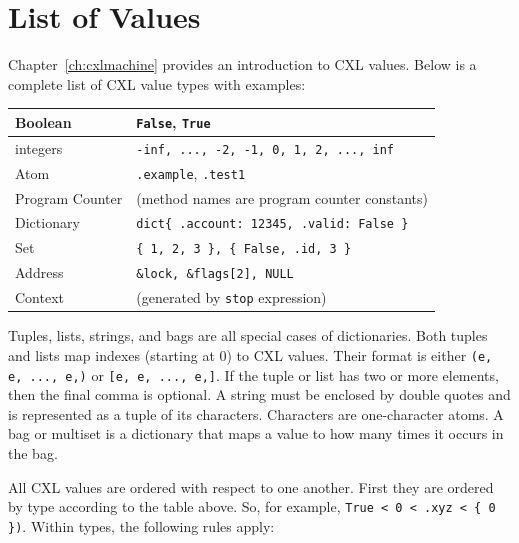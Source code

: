 \documentclass{report}
\begin{document}



\appendix

\chapter{List of Values}

Chapter~\ref{ch:cxlmachine} provides an introduction to CXL values.
Below is a complete list of CXL value types with examples:

\vspace{1em}
\begin{tabular}{|l|l|}
\hline
Boolean & \texttt{False}, \texttt{True} \\
\hline
integers & \texttt{-inf, ..., -2, -1, 0, 1, 2, ..., inf} \\
\hline
Atom & \texttt{.example}, \texttt{.test1} \\
\hline
Program Counter & (method names are program counter constants) \\
\hline
Dictionary & \texttt{dict\{ .account: 12345, .valid: False \} } \\
\hline
Set & \texttt{\{ 1, 2, 3 \}, \{ False, .id, 3 \} } \\
\hline
Address & \texttt{\&lock, \&flags[2], NULL} \\
\hline
Context & (generated by \texttt{stop} expression) \\
\hline
\end{tabular}
\vspace{1em}

Tuples, lists, strings, and bags are all special cases of dictionaries.
Both tuples and lists map indexes (starting at 0) to CXL values.
Their format is either \texttt{(e, e, ..., e,)} or
\texttt{[e, e, ..., e,]}.
If the tuple or list has two or more elements, then the final comma
is optional.
A string must be enclosed by double quotes and is represented as
a tuple of its characters.  Characters are one-character atoms.
A bag or multiset is a dictionary that maps a value to how many
times it occurs in the bag.

All CXL values are ordered with respect to one another.  First they
are ordered by type according to the table above.
So, for example, \texttt{\texttt{True} < 0 < .xyz < \{ 0 \})}.
Within types, the following rules apply:
\end{document}
